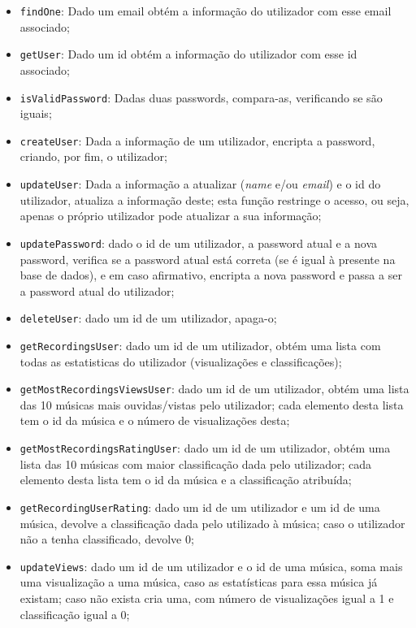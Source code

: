 \documentclass{article}
\begin{document}
    \begin{itemize}
        \item \texttt{findOne}: Dado um email obtém a informação do utilizador com esse email associado;
        \item \texttt{getUser}: Dado um id obtém a informação do utilizador com esse id associado;
        \item \texttt{isValidPassword}: Dadas duas passwords, compara-as, verificando se são iguais;
        \item \texttt{createUser}: Dada a informação de um utilizador, encripta a password, criando, por fim, o utilizador;
        \item \texttt{updateUser}: Dada a informação a atualizar (\textit{name} e/ou \textit{email}) e o id do utilizador, atualiza a informação deste; esta função restringe o acesso, ou seja, apenas o próprio utilizador pode atualizar a sua informação;
        \item \texttt{updatePassword}: dado o id de um utilizador, a password atual e a nova password, verifica se a password atual está correta (se é igual à presente na base de dados), e em caso afirmativo, encripta a nova password e passa a ser a password atual do utilizador;
        \item \texttt{deleteUser}: dado um id de um utilizador, apaga-o;
        \item \texttt{getRecordingsUser}: dado um id de um utilizador, obtém uma lista com todas as estatisticas do utilizador (visualizações e classificações);
        \item \texttt{getMostRecordingsViewsUser}: dado um id de um utilizador, obtém uma lista das 10 músicas mais ouvidas/vistas pelo utilizador; cada elemento desta lista tem o id da música e o número de visualizações desta;
        \item \texttt{getMostRecordingsRatingUser}: dado um id de um utilizador, obtém uma lista das 10 músicas com maior classificação dada pelo utilizador; cada elemento desta lista tem o id da música e a classificação atribuída;
        \item \texttt{getRecordingUserRating}: dado um id de um utilizador e um id de uma música, devolve a classificação dada pelo utilizado à música; caso o utilizador não a tenha classificado, devolve 0;
        \item \texttt{updateViews}: dado um id de um utilizador e o id de uma música, soma mais uma visualização a uma música, caso as estatísticas para essa música já existam; caso não exista cria uma, com número de visualizações igual a 1 e classificação igual a 0;

\end{itemize}
\end{document}

